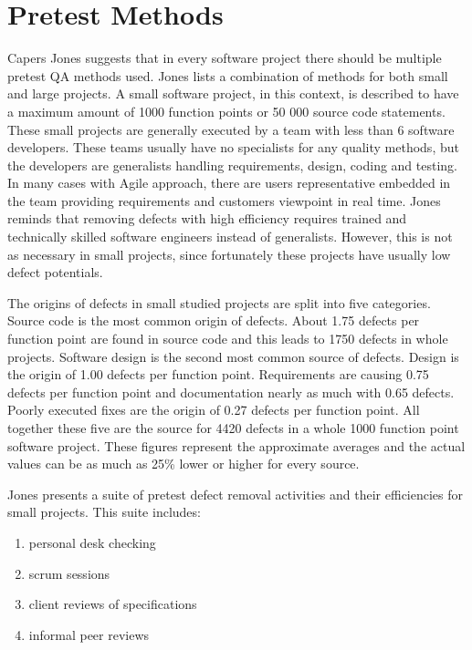 \section{Pretest Methods}

Capers Jones suggests that in every software project there should be multiple pretest QA methods used. Jones lists a combination of methods for both small and large projects. A small software project, in this context, is described to have a maximum amount of 1000 function points or 50 000 source code statements. These small projects are generally executed by a team with less than 6 software developers. These teams usually have no specialists for any quality methods, but the developers are generalists handling requirements, design, coding and testing. In many cases with Agile approach, there are users representative embedded in the team providing requirements and customers viewpoint in real time. Jones reminds that removing defects with high efficiency requires trained and technically skilled software engineers instead of generalists. However, this is not as necessary in small projects, since fortunately these projects have usually low defect potentials.

The origins of defects in small studied projects are split into five categories. Source code is the most common origin of defects. About 1.75 defects per function point are found in source code and this leads to 1750 defects in whole projects. Software design is the second most common source of defects. Design is the origin of 1.00 defects per function point. Requirements are causing 0.75 defects per function point and documentation nearly as much with 0.65 defects. Poorly executed fixes are the origin of 0.27 defects per function point. All together these five are the source for 4420 defects in a whole 1000 function point software project. These figures represent the approximate averages and the actual values can be as much as 25\% lower or higher for every source. 

Jones presents a suite of pretest defect removal activities and their efficiencies for small projects. This suite includes:

\begin{enumerate}

\item personal desk checking

\item scrum sessions

\item client reviews of specifications

\item informal peer reviews

\end{enumerate}

